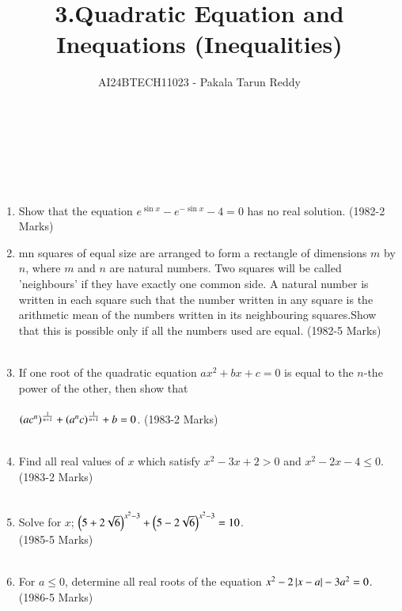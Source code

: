 \documentclass[journal,12pt,twocolumn]{IEEEtran}
\theoremstyle{remark}
\begin{document}

\vspace{3cm}

\title{3.Quadratic Equation and\\ Inequations (Inequalities)}
\author{AI24BTECH11023 - Pakala Tarun Reddy}
\\\\
\\

\begin{enumerate}[start=13]
\item Show that the equation $e^{\sin{x}}-e^{-\sin{x}}-4=0$ has no real solution.
\hfill{(1982-2 Marks)}\\
\item mn squares of equal size are arranged to form a rectangle of dimensions $m$ by $n$, where $m$ and $n$ are natural numbers. Two squares will be called 'neighbours' if they have exactly one common side. A natural number is written in each square such that the number written in any square is the arithmetic mean of the numbers written in its neighbouring squares.Show that this is possible only if all the numbers used are equal. 
\hfill{(1982-5 Marks)}\\\\
\item If one root of the quadratic equation $ax^2+bx+c=0$ is equal to the $n$-the power of the other, then show that\\\\
$\left(ac^n\right)^\frac{1}{n+1} +\left(a^nc\right)^\frac{1}{n+1}+b=0$. \hfill(1983-2 Marks)\\\\
 \item Find all real values of $x$ which satisfy $x^2-3x+2>0$ and $x^2-2x-4\leq 0$.\hfill{(1983-2 Marks)}\\\\
 \item Solve for $x$; $\left(5+2\sqrt{6}\right)^{x^2-3}+\left(5-2\sqrt{6}\right)^{x^2-3}=10$.\\ \hfill{(1985-5 Marks)}\\\\
 \item For $a \leq 0$, determine all real roots of the equation $x^2-2\left\vert x-a\right\vert-3a^2=0$. \hfill{(1986-5 Marks)}\\\\

\end{enumerate}
\end{document}
